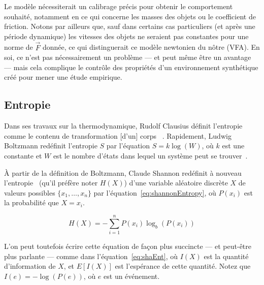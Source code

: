     
    Le modèle nécessiterait un calibrage précis pour obtenir le comportement souhaité, notamment en ce qui concerne les masses des objets ou le coefficient de friction. Notons par ailleurs que, sauf dans certains cas particuliers (et après une période dynamique) les vitesses des objets ne seraient pas constantes pour une norme de $\vec{F}$ donnée, ce qui distinguerait ce modèle newtonien du nôtre (VFA). En soi, ce n'est pas nécessairement un problème --- et peut même être un avantage --- mais cela complique le contrôle des propriétés d'un environnement synthétique créé pour mener une étude empirique.
	
	\FloatBarrier \subsection{Entropie}
	Dans ses travaux sur la thermodynamique, Rudolf Clausius définit l'entropie comme \og le contenu de transformation [d'un] corps \fg{}~\cite{clausius1865verschiedene, clausius1865diverses}. Rapidement, Ludwig Boltzmann redéfinit l'entropie $S$ par l'équation $S = k\log(W)$, où $k$ est une constante et $W$ est le nombre d'états dans lequel un système peut se trouver~\cite{boltzmann1866mechanische, weisstein2004eric}.
	
	À partir de la définition de Boltzmann, Claude Shannon redéfinit à nouveau l'entropie~\cite{shannon1949communication} (qu'il préfère noter $H(X)$) d'une variable aléatoire discrète $X$ de valeurs possibles $\{x_{1}, \ldots{}, x_{n}\}$ par l'équation~\ref{eq:shannonEntropy}, où $P(x_{i})$ est la probabilité que $X=x_{i}$.
	
	\begin{equation}
		\label{eq:shannonEntropy}
		H(X) = -\sum_{i=1}^{n}P(x_{i})\log_{b}\left(P(x_{i})\right)
	\end{equation}
	
	L'on peut toutefois écrire cette équation de façon plus succincte --- et peut-être plus parlante --- comme dans l'équation~\ref{eq:shaEnt}, où $I(X)$ est la quantité d'information de $X$, et $E[I(X)]$ est l'espérance de cette quantité. Notez que $I(e) = -\log\left(P(e)\right)$, où $e$ est un événement.
	
